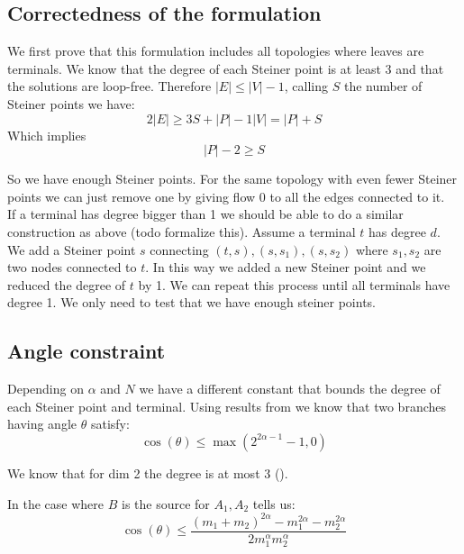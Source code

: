 \documentclass{article}
\begin{document}
    \subsection{Correctedness of the formulation}
    We first prove that this formulation includes all topologies where leaves are terminals.
    We know that the degree of each Steiner point is at least 3 and that the solutions are loop-free.
    Therefore $|E| \le |V| - 1$, calling $S$ the number of Steiner points we have:
    \begin{equation}
        2|E| \ge 3S + |P| - 1
        |V| = |P| + S
    \end{equation}
    Which implies
    \begin{equation}
        |P| -2 \ge S
    \end{equation}

    So we have enough Steiner points.
    For the same topology with even fewer Steiner points we can just remove one by giving
    flow 0 to all the edges connected to it.
    \\

    If a terminal has degree bigger than 1 we should be able to do a similar construction as above (todo formalize this).
    Assume a terminal $t$ has degree $d$. We add a Steiner point $s$ connecting $(t,s), (s, s_1), (s, s_2)$ where $s_1, s_2$
    are two nodes connected to $t$. In this way we added a new Steiner point and we reduced the degree of $t$ by 1.
    We can repeat this process until all terminals have degree 1. We only need to test that we have enough steiner points.

    \subsection{Angle constraint}
    Depending on $\alpha$ and $N$ we have a different constant that bounds the degree of each Steiner point and terminal.
    Using results from \cite[12.15]{Bernot} we know that two branches having angle $\theta$ satisfy:
    \begin{equation}
        \cos(\theta) \le \max(2^{2\alpha - 1} -1,0)
    \end{equation}

    We know that for dim 2 the degree is at most 3 (\cite{paper mandato per mail che si chiama così}).

    In the case where $B$ is the source for $A_1, A_2$ \cite[lemma 12.2]{Bernot} tells us:
    \begin{equation}
        \cos(\theta) \le \frac{(m_1 + m_2) ^ {2\alpha} - m_1^{2\alpha} - m_2^{2\alpha}}{2m_1^\alpha m_2^\alpha}
    \end{equation}
\end{document}
